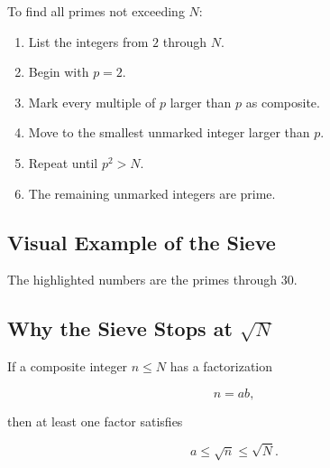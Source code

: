 To find all primes not exceeding \(N\):

\begin{enumerate}
    \item List the integers from \(2\) through \(N\).
    \item Begin with \(p=2\).
    \item Mark every multiple of \(p\) larger than \(p\) as composite.
    \item Move to the smallest unmarked integer larger than \(p\).
    \item Repeat until \(p^2>N\).
    \item The remaining unmarked integers are prime.
\end{enumerate}

\subsection{Visual Example of the Sieve}
\label{subsec:sieve-visual}

\begin{centereddiagram}
\end{centereddiagram}

The highlighted numbers are the primes through \(30\).

\subsection{Why the Sieve Stops at \(\sqrt N\)}
\label{subsec:sieve-square-root}

If a composite integer \(n\leq N\) has a factorization

\[ n=ab, \]

then at least one factor satisfies

\[ a\leq\sqrt n\leq\sqrt N. \]


